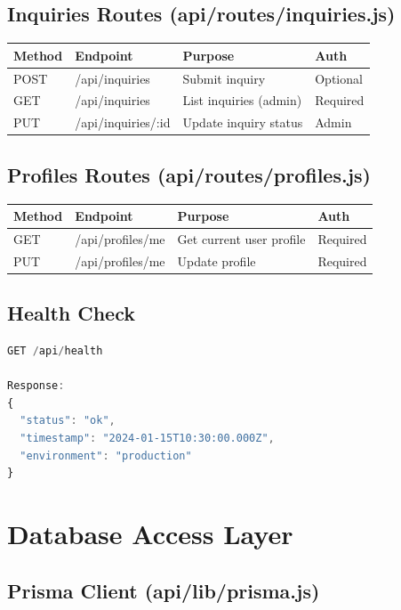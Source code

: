 \documentclass[12pt,a4paper]{report}
\begin{document}
\subsection{Inquiries Routes (api/routes/inquiries.js)}

\begin{longtable}{|p{2cm}|p{2.5cm}|p{3cm}|p{2.5cm}|}
\hline
\textbf{Method} & \textbf{Endpoint} & \textbf{Purpose} & \textbf{Auth} \\
\hline
POST & /api/inquiries & Submit inquiry & Optional \\
\hline
GET & /api/inquiries & List inquiries (admin) & Required \\
\hline
PUT & /api/inquiries/:id & Update inquiry status & Admin \\
\hline
\end{longtable}

\subsection{Profiles Routes (api/routes/profiles.js)}

\begin{longtable}{|p{2cm}|p{2.5cm}|p{3cm}|p{2.5cm}|}
\hline
\textbf{Method} & \textbf{Endpoint} & \textbf{Purpose} & \textbf{Auth} \\
\hline
GET & /api/profiles/me & Get current user profile & Required \\
\hline
PUT & /api/profiles/me & Update profile & Required \\
\hline
\end{longtable}

\subsection{Health Check}

\begin{lstlisting}[language=javascript, caption=Health Check Endpoint]
GET /api/health

Response:
{
  "status": "ok",
  "timestamp": "2024-01-15T10:30:00.000Z",
  "environment": "production"
}
\end{lstlisting}

\section{Database Access Layer}

\subsection{Prisma Client (api/lib/prisma.js)}
\end{document}
